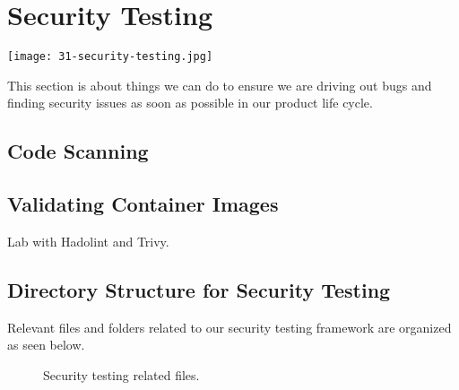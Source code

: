 \chapter{Security Testing}

\texttt{[image: 31-security-testing.jpg]}

This section is about things we can do to ensure we are driving out bugs and finding security issues as soon as possible in our product life cycle.


\section{Code Scanning}


\section{Validating Container Images}

\justifying
Lab with Hadolint and Trivy.


\section{Directory Structure for Security Testing}

\justifying
Relevant files and folders related to our security testing framework are organized as seen below.

\begin{figure}[!htb]
    
    \caption{Security testing related files.}
    \label{sectest}
\end{figure}
